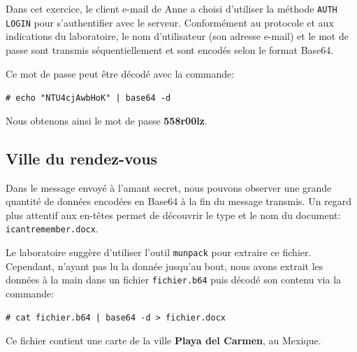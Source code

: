 \documentclass[11pt,a4paper]{article}
\newcommand{\shellcmd}[1]{\texttt{\footnotesize\# #1}}
\begin{document}
Dans cet exercice, le client e-mail de Anne a choisi d'utiliser la méthode \texttt{AUTH LOGIN} pour s'authentifier avec le serveur. Conformément au protocole et aux indications du laboratoire, le nom d'utilisateur (son adresse e-mail) et le mot de passe sont transmis séquentiellement et sont encodés selon le format Base64.

Ce mot de passe peut être décodé avec la commande:

\shellcmd{echo "NTU4cjAwbHoK" | base64 -d}

Nous obtenons ainsi le mot de passe \textbf{558r00lz}.

\subsection{Ville du rendez-vous}

Dans le message envoyé à l'amant secret, nous pouvons observer une grande quantité de données encodées en Base64 à la fin du message transmis. Un regard plus attentif aux en-têtes permet de découvrir le type et le nom du document: \texttt{icantremember.docx}.

Le laboratoire suggère d'utiliser l'outil \texttt{munpack} pour extraire ce fichier. Cependant, n'ayant pas lu la donnée jusqu'au bout, nous avons extrait les données à la main dans un fichier \texttt{fichier.b64} puis décodé son contenu via la commande:

\shellcmd{cat fichier.b64 | base64 -d > fichier.docx}

Ce fichier contient une carte de la ville \textbf{Playa del Carmen}, au Mexique.
\end{document}
